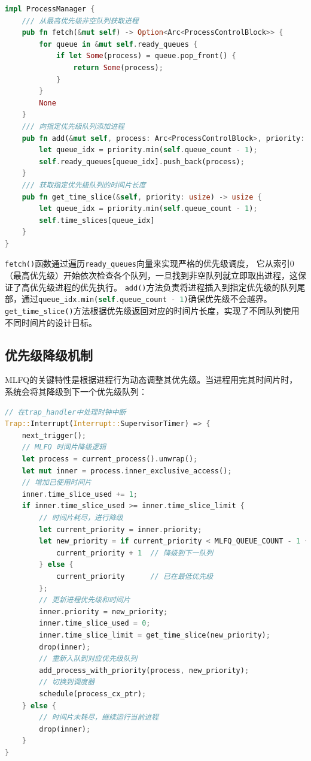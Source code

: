 \begin{lstlisting}[language=Rust,caption={MLFQ调度算法}, label={lst:mlfq-fetch}]
impl ProcessManager {
    /// 从最高优先级非空队列获取进程
    pub fn fetch(&mut self) -> Option<Arc<ProcessControlBlock>> {
        for queue in &mut self.ready_queues {
            if let Some(process) = queue.pop_front() {
                return Some(process);
            }
        }
        None
    }
    /// 向指定优先级队列添加进程
    pub fn add(&mut self, process: Arc<ProcessControlBlock>, priority: usize) {
        let queue_idx = priority.min(self.queue_count - 1);
        self.ready_queues[queue_idx].push_back(process);
    }
    /// 获取指定优先级队列的时间片长度
    pub fn get_time_slice(&self, priority: usize) -> usize {
        let queue_idx = priority.min(self.queue_count - 1);
        self.time_slices[queue_idx]
    }
}
\end{lstlisting}

\lstinline[language=Rust]{fetch()}函数通过遍历\lstinline[language=Rust]{ready_queues}向量来实现严格的优先级调度，
它从索引0（最高优先级）开始依次检查各个队列，一旦找到非空队列就立即取出进程，这保证了高优先级进程的优先执行。
\lstinline[language=Rust]{add()}方法负责将进程插入到指定优先级的队列尾部，通过\lstinline[language=Rust]{queue_idx.min(self.queue_count - 1)}确保优先级不会越界。
\lstinline[language=Rust]{get_time_slice()}方法根据优先级返回对应的时间片长度，实现了不同队列使用不同时间片的设计目标。

\subsection{优先级降级机制}

MLFQ的关键特性是根据进程行为动态调整其优先级。当进程用完其时间片时，
系统会将其降级到下一个优先级队列：

\begin{lstlisting}[language=Rust,caption={MLFQ时间片处理和降级}, label={lst:mlfq-downgrade}]
// 在trap_handler中处理时钟中断
Trap::Interrupt(Interrupt::SupervisorTimer) => {
    next_trigger();
    // MLFQ 时间片降级逻辑
    let process = current_process().unwrap();
    let mut inner = process.inner_exclusive_access();
    // 增加已使用时间片
    inner.time_slice_used += 1;
    if inner.time_slice_used >= inner.time_slice_limit {
        // 时间片耗尽，进行降级
        let current_priority = inner.priority;
        let new_priority = if current_priority < MLFQ_QUEUE_COUNT - 1 {
            current_priority + 1  // 降级到下一队列
        } else {
            current_priority      // 已在最低优先级
        };
        // 更新进程优先级和时间片
        inner.priority = new_priority;
        inner.time_slice_used = 0;
        inner.time_slice_limit = get_time_slice(new_priority);
        drop(inner);
        // 重新入队到对应优先级队列
        add_process_with_priority(process, new_priority);
        // 切换到调度器
        schedule(process_cx_ptr);
    } else {
        // 时间片未耗尽，继续运行当前进程
        drop(inner);
    }
}
\end{lstlisting}

